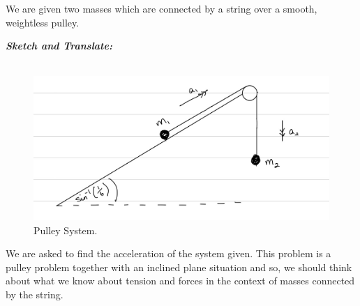 %
%
%


\begin{subquestions}
	
\subquestion

We are given two masses which are connected by a string over a smooth, weightless pulley.

\begin{subsubquestions}
	
	\subsubquestion
	
	\textbf{\textit{Sketch and Translate:}} \\ \\
	\begin{figure}[H]
		\begin{center}
			\includegraphics[scale=0.25]{../2006/figures/2006q5-1}
			\caption{\label{2006:q5:Sketch1} Pulley System.}
		\end{center}
	\end{figure}	
	We are asked to find the acceleration of the system given. This problem is a pulley problem together with an inclined plane situation and so, we should think about what we know about tension and forces in the context of masses connected by the string.
	
	
	

\end{subsubquestions}
\end{subquestions}

